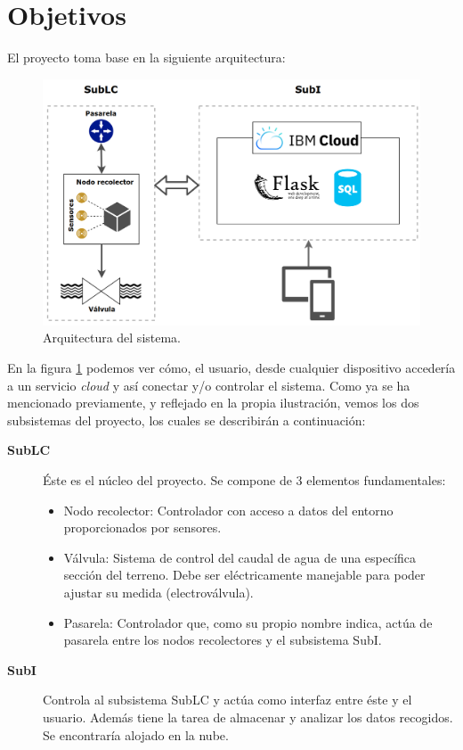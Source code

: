 
\newpage
\section{Objetivos}
\label{sec:target}

\justifying \setlength{\parindent}{1.27cm}
\normalsize\mdseries

El proyecto toma base en la siguiente arquitectura:

\begin{figure}[h]
    \centering
    \includegraphics[scale=0.5]{figures/diagrams/architecture.png}
    \caption{Arquitectura del sistema.}
    \label{fig:architecture}
\end{figure}

En la figura \ref{fig:architecture} podemos ver cómo, el usuario, desde cualquier dispositivo accedería a un servicio \textit{cloud} y así conectar y/o controlar el sistema. Como ya se ha mencionado previamente, y reflejado en la propia ilustración, vemos los dos subsistemas del proyecto, los cuales se describirán a continuación:

\begin{description}
    \item [\textbf{SubLC}] Éste es el núcleo del proyecto. Se compone de 3 elementos fundamentales:
    \begin{itemize}
        \item Nodo recolector: Controlador con acceso a datos del entorno proporcionados por sensores.
        \item Válvula: Sistema de control del caudal de agua de una específica sección del terreno. Debe ser eléctricamente manejable para poder ajustar su medida (electroválvula).
        \item Pasarela: Controlador que, como su propio nombre indica, actúa de pasarela entre los nodos recolectores y el subsistema SubI.
    \end{itemize}
    \item [\textbf{SubI}] Controla al subsistema SubLC y actúa como interfaz entre éste y el usuario. Además tiene la tarea de almacenar y analizar los datos recogidos. Se encontraría alojado en la nube.
\end{description}
